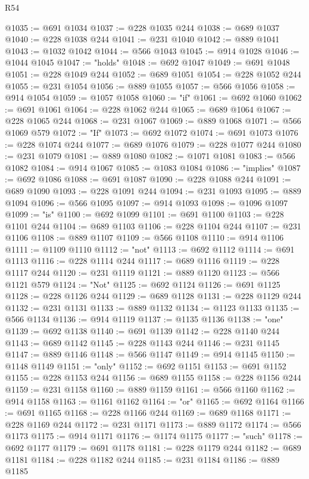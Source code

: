 \begin{lexlean}{R54}
\begin{coremodule}
@1035 := @691 @1034
@1037 := @228 @1035 @244
@1038 := @689 @1037
@1040 := @228 @1038 @244
@1041 := @231 @1040
@1042 := @889 @1041
@1043 := @1032 @1042
@1044 := @566 @1043
@1045 := @914 @1028
@1046 := @1044 @1045
@1047 := "holds"
@1048 := @692 @1047
@1049 := @691 @1048
@1051 := @228 @1049 @244
@1052 := @689 @1051
@1054 := @228 @1052 @244
@1055 := @231 @1054
@1056 := @889 @1055
@1057 := @566 @1056
@1058 := @914 @1054
@1059 := @1057 @1058
@1060 := "if"
@1061 := @692 @1060
@1062 := @691 @1061
@1064 := @228 @1062 @244
@1065 := @689 @1064
@1067 := @228 @1065 @244
@1068 := @231 @1067
@1069 := @889 @1068
@1071 := @566 @1069 @579
@1072 := "If"
@1073 := @692 @1072
@1074 := @691 @1073
@1076 := @228 @1074 @244
@1077 := @689 @1076
@1079 := @228 @1077 @244
@1080 := @231 @1079
@1081 := @889 @1080
@1082 := @1071 @1081
@1083 := @566 @1082
@1084 := @914 @1067
@1085 := @1083 @1084
@1086 := "implies"
@1087 := @692 @1086
@1088 := @691 @1087
@1090 := @228 @1088 @244
@1091 := @689 @1090
@1093 := @228 @1091 @244
@1094 := @231 @1093
@1095 := @889 @1094
@1096 := @566 @1095
@1097 := @914 @1093
@1098 := @1096 @1097
@1099 := "is"
@1100 := @692 @1099
@1101 := @691 @1100
@1103 := @228 @1101 @244
@1104 := @689 @1103
@1106 := @228 @1104 @244
@1107 := @231 @1106
@1108 := @889 @1107
@1109 := @566 @1108
@1110 := @914 @1106
@1111 := @1109 @1110
@1112 := "not"
@1113 := @692 @1112
@1114 := @691 @1113
@1116 := @228 @1114 @244
@1117 := @689 @1116
@1119 := @228 @1117 @244
@1120 := @231 @1119
@1121 := @889 @1120
@1123 := @566 @1121 @579
@1124 := "Not"
@1125 := @692 @1124
@1126 := @691 @1125
@1128 := @228 @1126 @244
@1129 := @689 @1128
@1131 := @228 @1129 @244
@1132 := @231 @1131
@1133 := @889 @1132
@1134 := @1123 @1133
@1135 := @566 @1134
@1136 := @914 @1119
@1137 := @1135 @1136
@1138 := "one"
@1139 := @692 @1138
@1140 := @691 @1139
@1142 := @228 @1140 @244
@1143 := @689 @1142
@1145 := @228 @1143 @244
@1146 := @231 @1145
@1147 := @889 @1146
@1148 := @566 @1147
@1149 := @914 @1145
@1150 := @1148 @1149
@1151 := "only"
@1152 := @692 @1151
@1153 := @691 @1152
@1155 := @228 @1153 @244
@1156 := @689 @1155
@1158 := @228 @1156 @244
@1159 := @231 @1158
@1160 := @889 @1159
@1161 := @566 @1160
@1162 := @914 @1158
@1163 := @1161 @1162
@1164 := "or"
@1165 := @692 @1164
@1166 := @691 @1165
@1168 := @228 @1166 @244
@1169 := @689 @1168
@1171 := @228 @1169 @244
@1172 := @231 @1171
@1173 := @889 @1172
@1174 := @566 @1173
@1175 := @914 @1171
@1176 := @1174 @1175
@1177 := "such"
@1178 := @692 @1177
@1179 := @691 @1178
@1181 := @228 @1179 @244
@1182 := @689 @1181
@1184 := @228 @1182 @244
@1185 := @231 @1184
@1186 := @889 @1185

\end{coremodule}
\end{lexlean}
